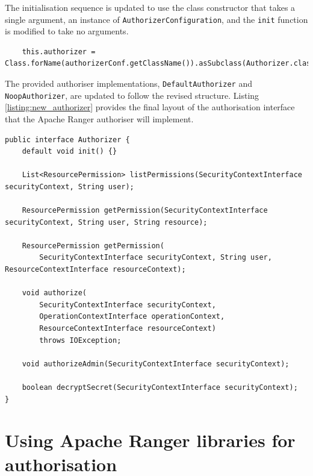 The initialisation sequence is updated to use the class constructor that takes a single argument, an instance of \texttt{AuthorizerConfiguration}, and the \texttt{init} function is modified to take no arguments.

\begin{verbatim}
    this.authorizer = Class.forName(authorizerConf.getClassName()).asSubclass(Authorizer.class).getConstructor(AuthorizerConfiguration.class).newInstance(authorizerConf);
\end{verbatim}

The provided authoriser implementations, \texttt{DefaultAuthorizer} and \texttt{NoopAuthorizer}, are updated to follow the revised structure. Listing \ref{listing:new_authorizer} provides the final layout of the authorisation interface that the Apache Ranger authoriser will implement.

\begin{listing}

\begin{verbatim}
public interface Authorizer {
    default void init() {}

    List<ResourcePermission> listPermissions(SecurityContextInterface securityContext, String user);

    ResourcePermission getPermission(SecurityContextInterface securityContext, String user, String resource);

    ResourcePermission getPermission(
        SecurityContextInterface securityContext, String user, ResourceContextInterface resourceContext);

    void authorize(
        SecurityContextInterface securityContext,
        OperationContextInterface operationContext,
        ResourceContextInterface resourceContext)
        throws IOException;

    void authorizeAdmin(SecurityContextInterface securityContext);

    boolean decryptSecret(SecurityContextInterface securityContext);
}
\end{verbatim}

\caption{Updated \texttt{org.openmetadata.service.Authorizer} interface in the OpenMetadata source code.}
\label{listing:new_authorizer}

\end{listing}

\section{Using Apache Ranger libraries for authorisation}

